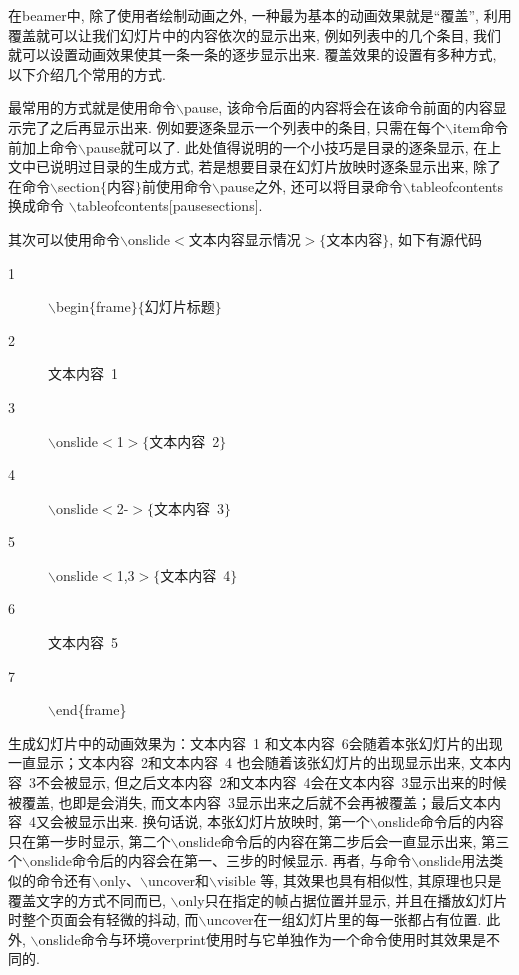 在beamer中, 除了使用者绘制动画之外, 一种最为基本的动画效果就是“覆盖”, 利用覆盖就可以让我们幻灯片中的内容依次的显示出来, 例如列表中的几个条目, 我们就可以设置动画效果使其一条一条的逐步显示出来. 覆盖效果的设置有多种方式, 以下介绍几个常用的方式.


最常用的方式就是使用命令$\backslash$pause, 该命令后面的内容将会在该命令前面的内容显示完了之后再显示出来. 例如要逐条显示一个列表中的条目, 只需在每个$\backslash$item命令前加上命令$\backslash$pause就可以了. 此处值得说明的一个小技巧是目录的逐条显示, 在上文中已说明过目录的生成方式, 若是想要目录在幻灯片放映时逐条显示出来, 除了在命令$\backslash$section$\{$内容$\}$前使用命令$\backslash$pause之外, 还可以将目录命令$\backslash$tableofcontents换成命令	$\backslash$tableofcontents[pausesections].


其次可以使用命令$\backslash$onslide$<$文本内容显示情况$>\{$文本内容$\}$, 如下有源代码
\begin{description}
  \item[1]$\backslash$begin$\{$frame$\}\{$幻灯片标题$\}$
  \item[2] 文本内容~1
  \item[3]$\backslash$onslide$<$1$>\{$文本内容~2$\}$
  \item[4]$\backslash$onslide$<$2-$>\{$文本内容~3$\}$
  \item[5]$\backslash$onslide$<$1,3$>\{$文本内容~4$\}$
  \item[6] 文本内容~5
  \item[7]$\backslash$end\{frame\}
\end{description}
生成幻灯片中的动画效果为：文本内容~1 和文本内容~6会随着本张幻灯片的出现一直显示；文本内容~2和文本内容~4 也会随着该张幻灯片的出现显示出来, 文本内容~3不会被显示, 但之后文本内容~2和文本内容~4会在文本内容~3显示出来的时候被覆盖, 也即是会消失, 而文本内容~3显示出来之后就不会再被覆盖；最后文本内容~4又会被显示出来. 换句话说, 本张幻灯片放映时, 第一个$\backslash$onslide命令后的内容只在第一步时显示, 第二个$\backslash$onslide命令后的内容在第二步后会一直显示出来, 第三个$\backslash$onslide命令后的内容会在第一、三步的时候显示. 再者, 与命令$\backslash$onslide用法类似的命令还有$\backslash$only、$\backslash$uncover和$\backslash$visible 等, 其效果也具有相似性, 其原理也只是覆盖文字的方式不同而已, $\backslash$only只在指定的帧占据位置并显示, 并且在播放幻灯片时整个页面会有轻微的抖动, 而$\backslash$uncover在一组幻灯片里的每一张都占有位置. 此外, $\backslash$onslide命令与环境overprint使用时与它单独作为一个命令使用时其效果是不同的.



